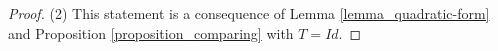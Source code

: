 \documentclass[12pt,a4paper]{article}
\def\min{\mathop{\rm min}\limits}
\def\max{\mathop{\rm max}\limits}
\begin{document}
\begin{proof}
(2) This statement is a consequence of
Lemma \ref{lemma_quadratic-form}
and Proposition \ref{proposition_comparing} with $T=Id$.
%
%

\end{proof}
\end{document}
